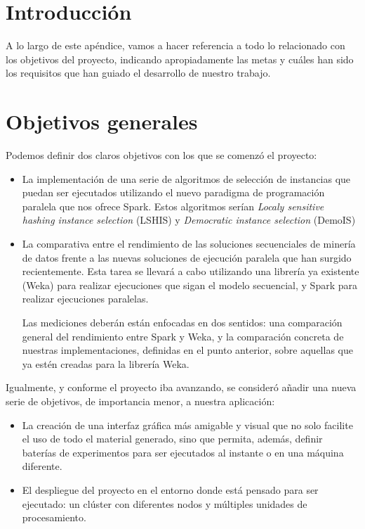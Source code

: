 

\section{Introducción}

A lo largo de este apéndice, vamos a hacer referencia a todo lo relacionado con los objetivos del proyecto, indicando apropiadamente las metas y cuáles han sido los requisitos que han guiado el desarrollo de nuestro trabajo.

\section{Objetivos generales}

Podemos definir dos claros objetivos con los que se comenzó el proyecto:
\begin{itemize}

\item La implementación de una serie de algoritmos de selección de instancias que puedan ser ejecutados utilizando el nuevo paradigma de programación paralela que nos ofrece Spark. Estos algoritmos serían \textit{Localy sensitive hashing instance selection} (LSHIS) \cite{LSHISPaper} y \textit{Democratic instance selection} (DemoIS) \cite{DemoISPaper}

\item La comparativa entre el rendimiento de las soluciones secuenciales de minería de datos frente a las nuevas soluciones de ejecución paralela que han surgido recientemente. Esta tarea se llevará a cabo utilizando una librería ya existente (Weka) para realizar ejecuciones que sigan el modelo secuencial, y Spark para realizar ejecuciones paralelas.

Las mediciones deberán están enfocadas en dos sentidos: una comparación general del rendimiento entre Spark y Weka, y la comparación concreta de nuestras implementaciones, definidas en el punto anterior, sobre aquellas que ya estén creadas para la librería Weka.
\end{itemize}

Igualmente, y conforme el proyecto iba avanzando, se consideró añadir una nueva serie de objetivos, de importancia menor, a nuestra aplicación:

\begin{itemize}
\item La creación de una interfaz gráfica más amigable y visual que no solo facilite el uso de todo el material generado, sino que permita, además, definir baterías de experimentos para ser ejecutados al instante o en una máquina diferente.
\item El despliegue del proyecto en el entorno donde está pensado para ser ejecutado: un clúster con diferentes nodos y múltiples unidades de procesamiento.
\end{itemize}

